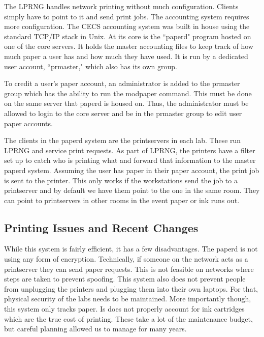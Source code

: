The LPRNG handles network printing without much configuration.  Clients simply have to point to it and send print jobs.  The accounting system requires more configuration.  The CECS accounting system was built in house using the standard TCP/IP stack in Unix.  At its core is the ``paperd" program hosted on one of the core servers.  It holds the master accounting files to keep track of how much paper a user has and how much they have used.  It is run by a dedicated user account, ``prmaster," which also has its own group.  

To credit a user's paper account, an administrator is added to the prmaster group which has the ability to run the modpaper command.  This must be done on the same server that paperd is housed on.  Thus, the administrator must be allowed to login to the core server and be in the prmaster group to edit user paper accounts.  

The clients in the paperd system are the printservers in each lab.  These run LPRNG and service print requests.  As part of LPRNG, the printers have a filter set up to catch who is printing what and forward that information to the master paperd system.  Assuming the user has paper in their paper account, the print job is sent to the printer. This only works if the workstations send the job to a printserver and by default we have them point to the one in the same room. They can point to printservers in other rooms in the event paper or ink runs out. 

\subsection{Printing Issues and Recent Changes}
While this system is fairly efficient, it has a few disadvantages.  The paperd is not using any form of encryption.  Technically, if someone on the network acts as a printserver they can send paper requests.  This is not feasible on networks where steps are taken to prevent spoofing.  This system also does not prevent people from unplugging the printers and plugging them into their own laptops.  For that, physical security of the labs needs to be maintained.  More importantly though, this system only tracks paper.  Is does not properly account for ink cartridges which are the true cost of printing.  These take a lot of the maintenance budget, but careful planning allowed us to manage for many years.  

